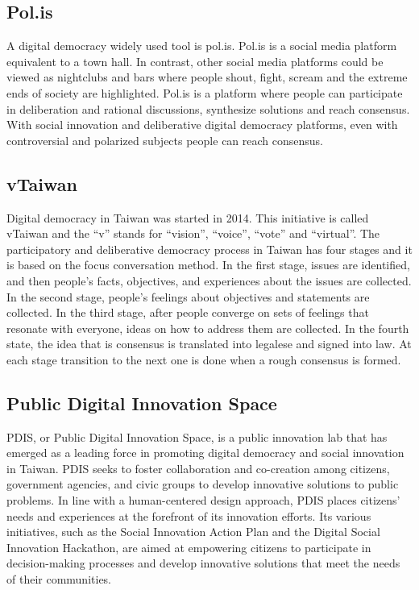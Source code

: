 \documentclass{IEEEtran}
\begin{document}
\subsection{Pol.is}
A digital democracy widely used tool is pol.is. Pol.is is a social media platform equivalent to a town hall. In contrast, other social media platforms could be viewed as nightclubs and bars where people shout, fight, scream and the extreme ends of society are highlighted. Pol.is is a platform where people can participate in deliberation and rational discussions, synthesize solutions and reach consensus.
With social innovation and deliberative digital democracy platforms, even with controversial and polarized subjects people can reach consensus.

\subsection{vTaiwan}
Digital democracy in Taiwan was started in 2014. This initiative is called vTaiwan and the “v” stands for “vision”, “voice”, “vote” and “virtual”. The participatory and deliberative democracy process in Taiwan has four stages and it is based on the focus conversation method. In the first stage, issues are identified, and then people’s facts, objectives, and experiences about the issues are collected. In the second stage, people's feelings about objectives and statements are collected. In the third stage, after people converge on sets of feelings that resonate with everyone, ideas on how to address them are collected. In the fourth state, the idea that is consensus is translated into legalese and signed into law. At each stage transition to the next one is done when a rough consensus is formed.


\subsection{Public Digital Innovation Space}
PDIS, or Public Digital Innovation Space, is a public innovation lab that has emerged as a leading force in promoting digital democracy and social innovation in Taiwan. PDIS seeks to foster collaboration and co-creation among citizens, government agencies, and civic groups to develop innovative solutions to public problems.
In line with a human-centered design approach, PDIS places citizens' needs and experiences at the forefront of its innovation efforts. Its various initiatives, such as the Social Innovation Action Plan and the Digital Social Innovation Hackathon, are aimed at empowering citizens to participate in decision-making processes and develop innovative solutions that meet the needs of their communities.
\end{document}
